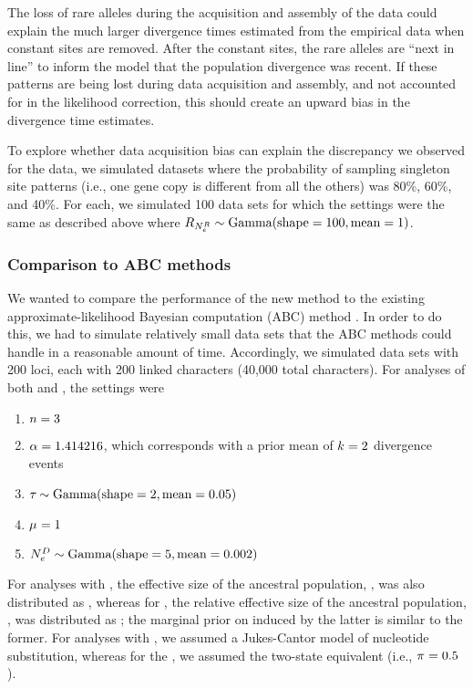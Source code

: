 The loss of rare alleles during the acquisition and assembly of the data could
explain the much larger divergence times estimated from the empirical data when
constant sites are removed.
After the constant sites, the rare alleles are ``next in line'' to inform the
model that the population divergence was recent.
If these patterns are being lost during data acquisition and assembly, and not
accounted for in the likelihood correction, this should create an upward bias
in the divergence time estimates.

To explore whether data acquisition bias can explain the discrepancy we
observed for the  data, we simulated datasets where the probability
of sampling singleton site patterns (i.e., one gene copy is different from all
the others) was 80\%, 60\%, and 40\%.
For each, we simulated 100 data sets for which the settings were
the same as described above where
$\rootrelativepopsize \sim \dgamma{100}{1}$.


\subsubsection{Comparison to ABC methods}
We wanted to compare the performance of the new method to the existing
approximate-likelihood Bayesian computation (ABC) method \dppmsbayes 
\citep{Oaks2014dpp}.
In order to do this, we had to simulate relatively small data sets that the ABC
methods could handle in a reasonable amount of time.
Accordingly, we simulated data sets with 200 loci, each with 200 linked
characters (40,000 total characters).
For analyses of both \ecoevolity and \dppmsbayes, the settings were
\begin{enumerate}
    \item $\ncomparisons = 3$
    \item $\concentration = 1.414216$, which corresponds with a prior mean of
        $\nevents = 2$ divergence events
    \item $\divtime \sim \dgamma{2}{0.05}$
    \item $\murate = 1$
    \item $\epopsize[\descendantpopindex{}] \sim \dgamma{5}{0.002}$
\end{enumerate}
For analyses with \dppmsbayes, the effective size of the ancestral population,
\epopsize[\rootpopindex], was also distributed as , whereas
for \ecoevolity, the relative effective size of the ancestral population,
\rootrelativepopsize, was distributed as ;
the marginal prior on \epopsize[\rootpopindex] induced by the latter is similar
to the former.
For analyses with \dppmsbayes, we assumed a Jukes-Cantor model of nucleotide
substitution, whereas for the \ecoevolity, we assumed the two-state equivalent
(i.e., $\gfreq = 0.5$).

